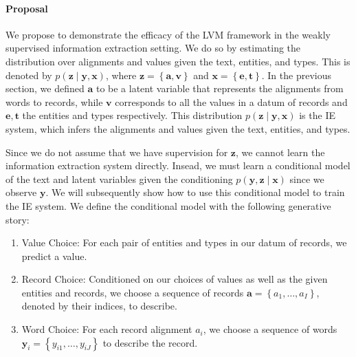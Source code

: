 \documentclass[11pt]{article}
\newcommand\set[1]{\left\{#1\right\}}
\newcommand{\ba}{\mathbf{a}}
\newcommand{\be}{\mathbf{e}}
\newcommand{\bt}{\mathbf{t}}
\newcommand{\bv}{\mathbf{v}}
\newcommand{\bx}{\mathbf{x}}
\newcommand{\by}{\mathbf{y}}
\newcommand{\bz}{\mathbf{z}}
\begin{document}
\paragraph{Proposal}
We propose to demonstrate the efficacy of the LVM framework in the
weakly supervised information extraction setting.
We do so by estimating the distribution over alignments and values
given the text, entities, and types.
This is denoted by $p(\bz\mid\by,\bx)$,
where $\bz = \set{\ba, \bv}$ and $\bx = \set{\be, \bt}$.
In the previous section, we defined $\ba$ to be a latent variable that represents the
alignments from words to records,
while $\bv$ corresponds to all the values in a datum of records
and $\be,\bt$ the entities and types respectively.
This distribution $p(\bz\mid\by,\bx)$ is the IE system,
which infers the alignments and values given the text, entities, and types.

Since we do not assume that we have supervision for $\bz$,
we cannot learn the information extraction system directly.
Insead, we must learn a conditional model 
of the text and latent variables given the conditioning
$p(\by,\bz\mid\bx)$ since we observe $\by$.
We will subsequently show how to use this conditional model to
train the IE system.
We define the conditional model with the following generative story:
\begin{enumerate}
\item Value Choice:
For each pair of entities and types in our datum of records, we predict a value.
\item Record Choice:
Conditioned on our choices of values as well as the given entities and records,
we choose a sequence of records $\ba = \set{a_1,\ldots,a_I}$,
denoted by their indices, to describe.
\item Word Choice:
For each record alignment $a_i$,
we choose a sequence of words $\by_i = \set{y_{i1},\ldots,y_{iJ}}$ to describe the record.
\end{enumerate}
\end{document}

